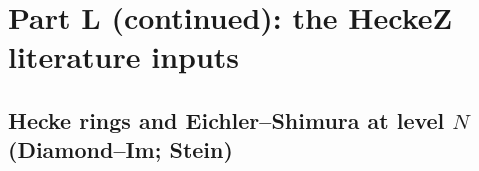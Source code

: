 %
%

\chapter{Part L (continued): the HeckeZ literature inputs}

\providecommand{\VERIFYloc}[1]{\textbf{Locator: #1.}}

\section{Hecke rings and Eichler--Shimura at level $N$ (Diamond--Im; Stein)}

